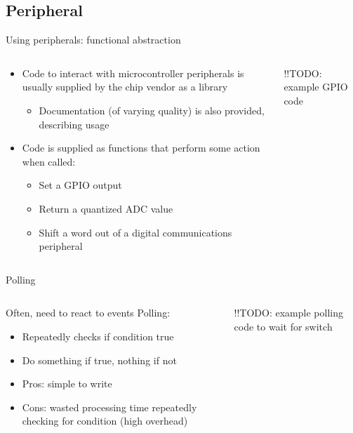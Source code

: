 \documentclass{beamer}
\begin{document}
\subsection{Peripheral}
\begin{frame}{Using peripherals: functional abstraction}
  \begin{columns}[T]
    \begin{column}{.6\textwidth}
      \begin{itemize}
        \item Code to interact with microcontroller peripherals is usually supplied by the chip vendor as a library
        \begin{itemize}
          \item Documentation (of varying quality) is also provided, describing usage
        \end{itemize}
        \item Code is supplied as functions that perform some action when called:
        \begin{itemize}
          \item Set a GPIO output
          \item Return a quantized ADC value
          \item Shift a word out of a digital communications peripheral
        \end{itemize}        
      \end{itemize}
    \end{column}

    \begin{column}{0.4\textwidth}
      !!TODO: example GPIO code
    \end{column}
  \end{columns}
\end{frame}

\begin{frame}{Polling}
  \begin{columns}[T]
    \begin{column}{.6\textwidth}
      Often, need to react to events \newline
      \newline
      Polling:
      \begin{itemize}
        \item Repeatedly checks if condition true
        \item Do something if true, nothing if not
        \item Pros: simple to write
        \item Cons: wasted processing time repeatedly checking for condition (high overhead)
      \end{itemize}
    \end{column}

    \begin{column}{0.4\textwidth}
      !!TODO: example polling code to wait for switch
    \end{column}
  \end{columns}
\end{frame}
\end{document}
